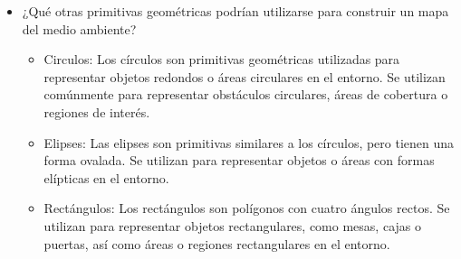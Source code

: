 \documentclass{article}
\begin{document}
\begin{itemize}
  \item {¿Qué otras primitivas geométricas podrían utilizarse para construir un mapa del medio ambiente?}

    
    \begin{itemize}
    \item Circulos: Los círculos son primitivas geométricas utilizadas para representar objetos redondos o áreas circulares en el entorno. Se utilizan comúnmente para representar obstáculos circulares, áreas de cobertura o regiones de interés. 
    \item Elipses: Las elipses son primitivas similares a los círculos, pero tienen una forma ovalada. Se utilizan para representar objetos o áreas con formas elípticas en el entorno.
    \item Rectángulos: Los rectángulos son polígonos con cuatro ángulos rectos. Se utilizan para representar objetos rectangulares, como mesas, cajas o puertas, así como áreas o regiones rectangulares en el entorno. 
    \end{itemize}
\end{itemize}
\end{document}
